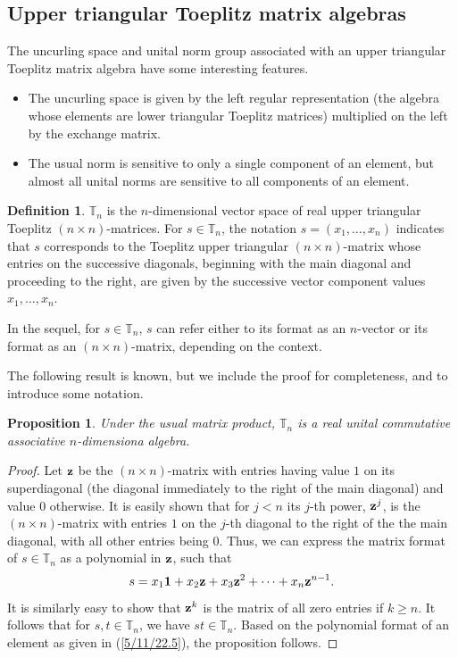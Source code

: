 \documentclass{amsart}
\numberwithin{equation}{section}
\newtheorem{proposition}[theorem]{Proposition}
\theoremstyle{definition}
\newtheorem{definition}[theorem]{Definition}
\numberwithin{theorem}{section}
\begin{document}
\subsection{Upper triangular Toeplitz matrix algebras}

The uncurling space and unital norm group associated with an upper triangular Toeplitz matrix algebra have some interesting features.
\begin{itemize}\item The uncurling space is given by the left regular representation (the algebra whose elements are lower triangular Toeplitz matrices) multiplied on the left by the exchange matrix. \item The usual norm is sensitive to only a single component of an element, but almost all unital norms are sensitive to all components of an element.\end{itemize}


 \begin{definition}\label{5/4/22.1} $\mathbb{T}_n$ is the $n$-dimensional vector space of real upper triangular Toeplitz $(n\times n)$-matrices. For $s\in \mathbb{T}_n$, the notation $s=(x_1,\dots,x_n)$ indicates that $s$ corresponds to the Toeplitz upper triangular $(n\times n)$-matrix whose entries on the successive diagonals, beginning with the main diagonal and proceeding to the right, are given by the successive vector component values $x_1,\dots,x_n$.   
\end{definition}

In the sequel, for $s\in \mathbb{T}_n$, $s$ can refer either to its format as an $n$-vector or its format as an $(n\times n)$-matrix, depending on the context.


The following result is known, but we include the proof for completeness, and to introduce some notation.  



 \begin{proposition}\label{5/10/22.1} Under the usual matrix product, $\mathbb{T}_n$ is a real unital commutative associative $n$-dimensiona algebra.\end{proposition} 
 
 \begin{proof}
Let ${\bf z}$ be the $(n \times n)$-matrix with entries having value $1$ on its superdiagonal  (the diagonal immediately to the right of the main diagonal) and value $0$ otherwise.  It is easily shown that for $j<n$ its $j$-th power, ${\bf z}^j$, is the $(n\times n)$-matrix with entries $1$ on the $j$-th diagonal to the right of the the main diagonal, with all other entries being $0$.   Thus, we can express the matrix format of $s\in\mathbb{T}_n$ as a polynomial in ${\bf z}$, such that
\begin{equation}\label{5/11/22.5} s = x_1 {\bf 1} + x_2 {\bf z} + x_3 {\bf z}^2 + \cdots + x_n {\bf z}^{n-1}.\end{equation}  It is similarly easy to show that ${\bf z}^k$ is the matrix of all zero entries if $k\ge n$.  It follows that for $s,t\in \mathbb{T}_n$, we have $st\in \mathbb{T}_n$.   Based on the polynomial format of an element as given in (\ref{5/11/22.5}), the proposition follows.
 \end{proof}
 
\end{document}
